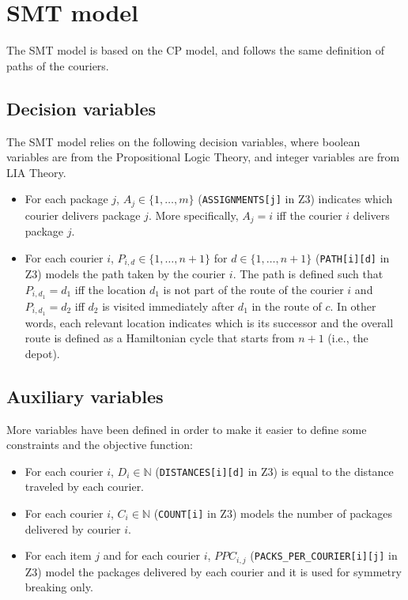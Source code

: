 \section{SMT model}

The SMT model is based on the CP model, and follows the same definition of paths of the couriers. 

\subsection{Decision variables}

The SMT model relies on the following decision variables, where boolean variables are from the Propositional Logic Theory, and integer variables are from LIA Theory.

\begin{itemize}
    \item For each package $j$, $A_j \in \{1, \dots, m\}$ (\texttt{ASSIGNMENTS[j]} in Z3) indicates which courier delivers package $j$. More specifically, $A_j = i$ iff the courier $i$ delivers package $j$.
    
    \item For each courier $i$, $P_{i,d} \in \{1, \dots, n + 1\}$ for $d \in \{1, \dots, n + 1\}$ (\texttt{PATH[i][d]} in Z3) models the path taken by the courier $i$. The path is defined such that $P_{i, d_1} = d_1$ iff the location $d_1$ is not part of the route of the courier $i$ and $P_{i, d_1} = d_2$ iff $d_2$ is visited immediately after $d_1$ in the route of $c$. In other words, each relevant location indicates which is its successor and the overall route is defined as a Hamiltonian cycle that starts from $n+1$ (i.e., the depot).

\end{itemize}

\subsection{Auxiliary variables}
More variables have been defined in order to make it easier to define some constraints and the objective function:

\begin{itemize}
    \item For each courier $i$, $D_i \in \mathbb{N}$ (\texttt{DISTANCES[i][d]} in Z3) is equal to the distance traveled by each courier.

    \item For each courier $i$, $C_i \in \mathbb{N}$ (\texttt{COUNT[i]} in Z3) models the number of packages delivered by courier $i$.

    \item For each item $j$ and for each courier $i$, $PPC_{i,j}$ (\texttt{PACKS\_PER\_COURIER[i][j]} in Z3) model the packages delivered by each courier and it is used for symmetry breaking only.
\end{itemize}

